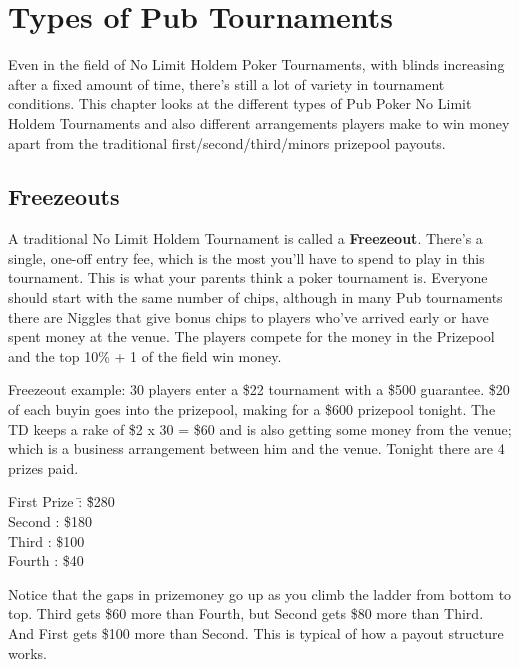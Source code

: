 \chapter{Types of Pub Tournaments}


Even in the field of No Limit Holdem Poker Tournaments,
with blinds increasing after a fixed amount of time, there's still a
lot of variety in tournament conditions. This chapter
looks at the different types of Pub Poker No Limit Holdem Tournaments
and also different arrangements players make to win money apart
from the traditional first/second/third/minors prizepool payouts.

\section{Freezeouts}

A traditional No Limit Holdem Tournament is called a \textbf{Freezeout}.
There's a single, one-off entry fee, which is the most you'll have to
spend to play in this tournament. This is what your parents
think a poker tournament is. Everyone should start with the same number
of chips, although in many Pub tournaments there are Niggles
that give bonus chips to players who've arrived early or have spent
money at the venue. The players compete for the
money in the Prizepool and the top 10\% + 1 of the field win money.

Freezeout example: 30 players enter a \$22 tournament with a \$500
guarantee. \$20 of each buyin goes into the prizepool, making for a \$600
prizepool tonight. The TD keeps a rake of \$2 x 30 = \$60 and is also
getting some money from the venue; which is a business arrangement
between him and the venue. Tonight there are 4 prizes paid.

\begin{tabbing}
First Prize  \=: \= \$280 \\
Second       \>: \> \$180 \\
Third        \>: \> \$100 \\
Fourth       \>: \> \$40
\end{tabbing}


Notice that the gaps in prizemoney go up as you climb the ladder
from bottom to top. Third gets \$60 more than Fourth, but Second gets
\$80 more than Third. And First gets \$100 more than Second. This is
typical of how a payout structure works.

